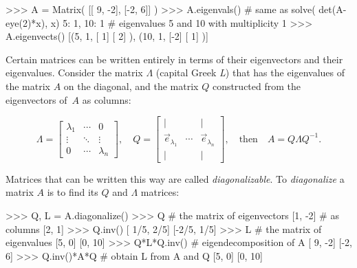 		

\small
\begin{verbatimtab}
>>> A = Matrix( [[ 9, -2],
                 [-2,  6]] )
>>> A.eigenvals()   # same as  solve( det(A-eye(2)*x), x)
{5: 1, 10: 1}       # eigenvalues 5 and 10 with multiplicity 1
>>> A.eigenvects()   
[(5, 1, [ 1]  
        [ 2]  ),      (10, 1, [-2]
                              [ 1]  )]
\end{verbatimtab}
\normalsize

\noindent


		Certain matrices can be written entirely in terms of their eigenvectors and their eigenvalues.
		Consider the matrix $\Lambda$ (capital Greek \emph{L}) that has the eigenvalues of the matrix $A$ on the diagonal, 
		and the matrix $Q$ constructed from the eigenvectors of~$A$ as columns:
  
            \[
            \Lambda = 
            \begin{bmatrix}
            \lambda_1 & \cdots & 0 \\
            \vdots & \ddots & \vdots \\
            0 & \cdots & \lambda_n
            \end{bmatrix}\!,
            \quad
            Q = 
            \begin{bmatrix}
            \big| & & \big| \\
            \vec{e}_{\lambda_1} & \cdots & \vec{e}_{\lambda_n} \\
            \big| & & \big| 
            \end{bmatrix}\!,
            \quad
            \text{then} \quad 
            A = Q \Lambda Q^{-1}.
            \]
            

		Matrices that can be written this way are called \emph{diagonalizable}.		
To \emph{diagonalize} a matrix $A$ is to find its $Q$ and $\Lambda$ matrices:

\small
\begin{verbatimtab}
>>> Q, L = A.diagonalize()
>>> Q               # the matrix of eigenvectors 
[1,  -2]            # as columns 
[2,   1]
>>> Q.inv()
[ 1/5, 2/5]
[-2/5, 1/5]
>>> L               # the matrix of eigenvalues
[5,  0]
[0, 10]
>>> Q*L*Q.inv()     # eigendecomposition of A
[ 9, -2]
[-2,  6]
>>> Q.inv()*A*Q     # obtain L from A and Q 
[5,  0]
[0, 10]
\end{verbatimtab}
\normalsize
		
